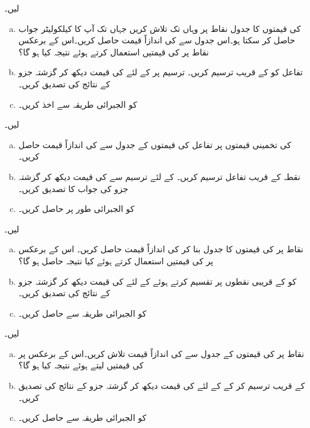 لیں۔
\begin{enumerate}[a.]
\item
{} کی قیمتوں کا جدول نقاط  پر وہاں تک تلاش کریں جہاں تک آپ کا کیلکولیٹر جواب حاصل کر سکتا ہو۔اس جدول سے  کی اندازاً قیمت حاصل کریں۔اس کے برعکس نقاط  پر  کی قیمتیں استعمال کرتے ہوئے نتیجہ کیا ہو گا؟
\item
تفاعل کو  کے قریب ترسیم کریں۔ ترسیم پر  کے لئے  کی قیمت دیکھ کر  گزشتہ جزو کے نتائج کی تصدیق کریں۔ 
\item
{} کو الجبرائی طریقہ سے اخذ کریں۔
\end{enumerate}
 لیں۔
\begin{enumerate}[a.]
\item
{} کی تخمینی قیمتوں  پر تفاعل کی قیمتوں کے جدول سے   کی اندازاً قیمت حاصل کریں۔
\item
نقطہ  کے قریب تفاعل ترسیم کریں۔ کے لئے ترسیم سے  کی قیمت دیکھ کر گزشتہ جزو کی جواب کا تصدیق کریں۔
\item
{} کو الجبرائی طور پر حاصل کریں۔
\end{enumerate}
 لیں۔
\begin{enumerate}[a.]
\item
نقاط  پر  کی قیمتوں کا جدول بنا کر  کی اندازاً قیمت حاصل کریں۔ اس کے برعکس  پر  کی قیمتیں استعمال کرتے ہوئے کیا نتیجہ حاصل ہو گا؟
\item
{} کو  کے قریبی نقطوں پر تقسیم کرتے ہوئے  کے لئے  کی قیمت دیکھ کر گزشتہ جزو کے نتائج کی تصدیق کریں۔
\item
{} کو الجبرائی طریقہ سے حاصل کریں۔
\end{enumerate}
 لیں۔
\begin{enumerate}[a.]
\item
نقاط  پر  کی قیمتوں کے جدول سے  کی اندازاً قیمت تلاش کریں۔اس کے برعکس  پر  کی قیمتیں لیتے ہوئے نتیجہ کیا ہو گا؟
\item
{} کے قریب  ترسیم کر کے  کے لئے  کی قیمت دیکھ کر گزشتہ جزو کے نتائج کی تصدیق کریں۔
\item
{} کو الجبرائی طریقہ سے حاصل کریں۔
\end{enumerate}
